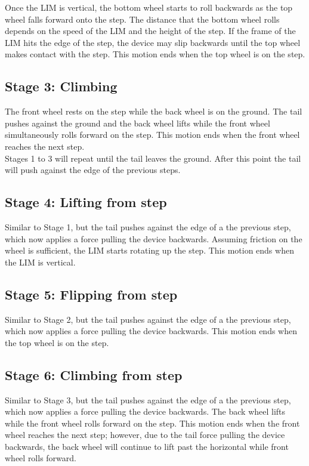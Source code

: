 Once the LIM is vertical, the bottom wheel starts to roll backwards as the top wheel falls forward onto the step. The distance that the bottom wheel rolls depends on the speed of the LIM and the height of the step. If the frame of the LIM hits the edge of the step, the device may slip backwards until the top wheel makes contact with the step. This motion ends when the top wheel is on the step.\\

\subsection*{Stage 3: Climbing}

The front wheel rests on the step while the back wheel is on the ground. The tail pushes against the ground and the back wheel lifts while the front wheel simultaneously rolls forward on the step. This motion ends when the front wheel reaches the next step.\\

Stages 1 to 3 will repeat until the tail leaves the ground. After this point the tail will push against the edge of the previous steps. 

\subsection*{Stage 4: Lifting from step}

Similar to Stage 1, but the tail pushes against the edge of a the previous step, which now applies a force pulling the device backwards. Assuming friction on the wheel is sufficient, the LIM starts rotating up the step. This motion ends when the LIM is vertical.

\subsection*{Stage 5: Flipping from step}

Similar to Stage 2, but the tail pushes against the edge of a the previous step, which now applies a force pulling the device backwards. This motion ends when the top wheel is on the step.\\

\subsection*{Stage 6: Climbing from step}

Similar to Stage 3, but the tail pushes against the edge of a the previous step, which now applies a force pulling the device backwards. The back wheel lifts while the front wheel rolls forward on the step. This motion ends when the front wheel reaches the next step; however, due to the tail force pulling the device backwards, the back wheel will continue to lift past the horizontal while front wheel rolls forward.\\


